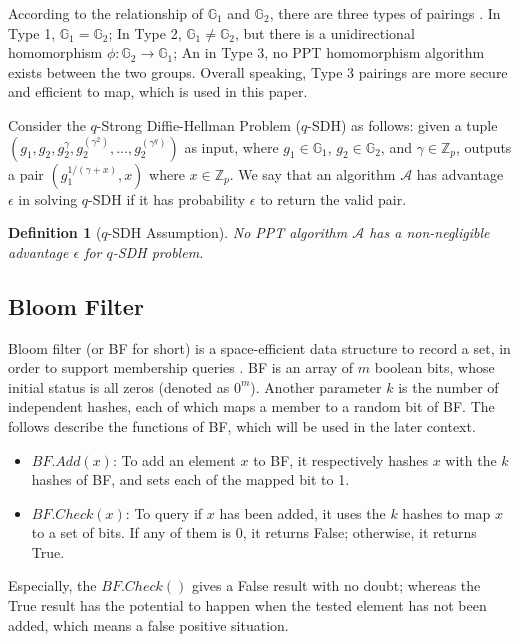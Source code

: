\documentclass[conference]{IEEEtran}
\newtheorem{definition}{Definition}
\begin{document}
According to the relationship of $\mathbb{G}_1$ and $\mathbb{G}_2$, there are three types of pairings \cite{GALBRAITH20083113}. 
In Type 1, $\mathbb{G}_1 = \mathbb{G}_2$; In Type 2, $\mathbb{G}_1 \neq \mathbb{G}_2$, but there is a unidirectional homomorphism $\phi:\mathbb{G}_2 \rightarrow \mathbb{G}_1$; An in Type 3, no PPT homomorphism algorithm exists between the two groups.
Overall speaking, Type 3 pairings are more secure and efficient to map, which is used in this paper.

Consider the $q$-Strong Diffie-Hellman Problem ($q$-SDH) \cite{Boneh2004} as follows: given a tuple $(g_1, g_2, g_2^{\gamma}, g_2^{(\gamma^2)}, \dots, g_2^{(\gamma^q)})$ as input, where $g_1\in\mathbb{G}_1$, $g_2\in\mathbb{G}_2$, and $\gamma\in \mathbb{Z}_p$, outputs a pair $(g_1^{1/(\gamma + x)}, x)$ where $x \in \mathbb{Z}_p$. We say that an algorithm $\mathcal{A}$ has advantage $\epsilon$ in solving $q$-SDH if it has probability $\epsilon$ to return the valid pair.

\begin{definition}[$q$-SDH Assumption]
	No PPT algorithm $\mathcal{A}$ has a non-negligible advantage $\epsilon$ for $q$-SDH problem.
\end{definition}


\subsection{Bloom Filter}\label{section:bf}
Bloom filter (or BF for short) is a space-efficient data structure to record a set, in order to support membership queries \cite{Bloom1970, broder2004network}.
BF is an array of $m$ boolean bits, whose initial status is all zeros (denoted as $0^m$). Another parameter $k$ is the number of independent hashes, each of which maps a member to a random bit of BF. The follows describe the functions of BF, which will be used in the later context.

\begin{itemize}
    \item $BF.Add(x)$: To add an element $x$ to BF, it respectively hashes $x$ with the $k$ hashes of BF, and sets each of the mapped bit to 1.
	\item $BF.Check(x)$: To query if $x$ has been added, it uses the $k$ hashes to map $x$ to a set of bits. If any of them is 0, it returns False; otherwise, it returns True. 
\end{itemize}

Especially, the $BF.Check()$ gives a False result with no doubt; whereas the True result has the potential to happen when the tested element has not been added, which means a false positive situation. 
\end{document}
